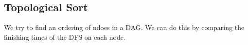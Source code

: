 \documentclass[landscape,4pt,a4paper]{article}
\begin{document}
\begin{multicols*}{5}
			\subsection{Topological Sort}
				We try to find an ordering of ndoes in a DAG. We can do this by comparing the finishing 
				times of the DFS on each node.
	\end{multicols*}
\end{document}
